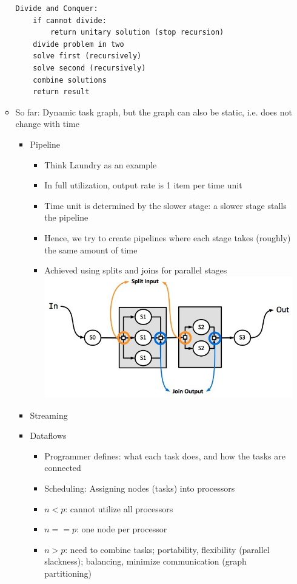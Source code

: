 \documentclass[a4paper]{article}
\begin{document}
\begin{itemize}
\begin{itemize}
\begin{lstlisting}
Divide and Conquer:
    if cannot divide:
        return unitary solution (stop recursion)
    divide problem in two
    solve first (recursively)
    solve second (recursively)
    combine solutions
    return result
\end{lstlisting}
\item So far: Dynamic task graph, but the graph can also be static, i.e. does not change with time
\begin{itemize}
\item Pipeline
\begin{itemize}
\item Think Laundry as an example
\item In full utilization, output rate is 1 item per time unit
\item Time unit is determined by the slower stage: a slower stage stalls the pipeline
\item Hence, we try to create pipelines where each stage takes (roughly) the same amount of time
\item Achieved using splits and joins for parallel stages\\\includegraphics[scale=0.38]{Figures/chapter4slide30.jpg}
\end{itemize}
\item Streaming
\item Dataflows
\begin{itemize}
\item Programmer defines: what each task does, and how the tasks are connected
\item Scheduling: Assigning nodes (tasks) into processors
\item $n<p$: cannot utilize all processors
\item $n == p$: one node per processor
\item $n>p$: need to combine tasks; portability, flexibility (parallel slackness); balancing, minimize communication (graph partitioning)

\end{itemize}
\end{itemize}
\end{itemize}
\end{itemize}
\end{document}
